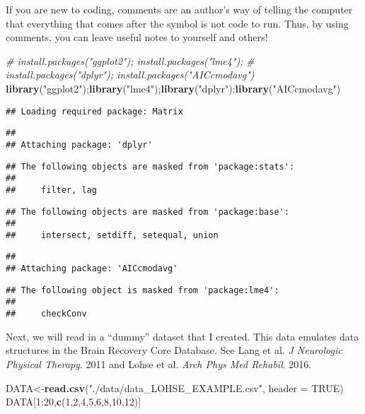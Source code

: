 \documentclass[]{article}
\newenvironment{Shaded}{\begin{snugshade}}{\end{snugshade}}
\newcommand{\KeywordTok}[1]{\textcolor[rgb]{0.13,0.29,0.53}{\textbf{{#1}}}}
\newcommand{\DataTypeTok}[1]{\textcolor[rgb]{0.13,0.29,0.53}{{#1}}}
\newcommand{\DecValTok}[1]{\textcolor[rgb]{0.00,0.00,0.81}{{#1}}}
\newcommand{\StringTok}[1]{\textcolor[rgb]{0.31,0.60,0.02}{{#1}}}
\newcommand{\CommentTok}[1]{\textcolor[rgb]{0.56,0.35,0.01}{\textit{{#1}}}}
\newcommand{\OtherTok}[1]{\textcolor[rgb]{0.56,0.35,0.01}{{#1}}}
\newcommand{\NormalTok}[1]{{#1}}
\begin{document}
If you are new to coding, comments are an author's way of telling the
computer that everything that comes after the symbol is not code to run.
Thus, by using comments, you can leave useful notes to yourself and
others!

\begin{Shaded}
\begin{Highlighting}[]
\CommentTok{# install.packages("ggplot2"); install.packages("lme4"); }
\CommentTok{# install.packages("dplyr"); install.packages("AICcmodavg")}
\KeywordTok{library}\NormalTok{(}\StringTok{"ggplot2"}\NormalTok{);}\KeywordTok{library}\NormalTok{(}\StringTok{"lme4"}\NormalTok{);}\KeywordTok{library}\NormalTok{(}\StringTok{"dplyr"}\NormalTok{);}\KeywordTok{library}\NormalTok{(}\StringTok{"AICcmodavg"}\NormalTok{)}
\end{Highlighting}
\end{Shaded}

\begin{verbatim}
## Loading required package: Matrix
\end{verbatim}

\begin{verbatim}
## 
## Attaching package: 'dplyr'
\end{verbatim}

\begin{verbatim}
## The following objects are masked from 'package:stats':
## 
##     filter, lag
\end{verbatim}

\begin{verbatim}
## The following objects are masked from 'package:base':
## 
##     intersect, setdiff, setequal, union
\end{verbatim}

\begin{verbatim}
## 
## Attaching package: 'AICcmodavg'
\end{verbatim}

\begin{verbatim}
## The following object is masked from 'package:lme4':
## 
##     checkConv
\end{verbatim}

Next, we will read in a ``dummy'' dataset that I created. This data
emulates data structures in the Brain Recovery Core Database. See Lang
et al. \emph{J Neurologic Physical Therapy}. 2011 and Lohse et al.
\emph{Arch Phys Med Rehabil}. 2016.

\begin{Shaded}
\begin{Highlighting}[]
\NormalTok{DATA<-}\KeywordTok{read.csv}\NormalTok{(}\StringTok{"./data/data_LOHSE_EXAMPLE.csv"}\NormalTok{, }\DataTypeTok{header =} \OtherTok{TRUE}\NormalTok{) }
\NormalTok{DATA[}\DecValTok{1}\NormalTok{:}\DecValTok{20}\NormalTok{,}\KeywordTok{c}\NormalTok{(}\DecValTok{1}\NormalTok{,}\DecValTok{2}\NormalTok{,}\DecValTok{4}\NormalTok{,}\DecValTok{5}\NormalTok{,}\DecValTok{6}\NormalTok{,}\DecValTok{8}\NormalTok{,}\DecValTok{10}\NormalTok{,}\DecValTok{12}\NormalTok{)]}
\end{Highlighting}
\end{Shaded}
\end{document}
